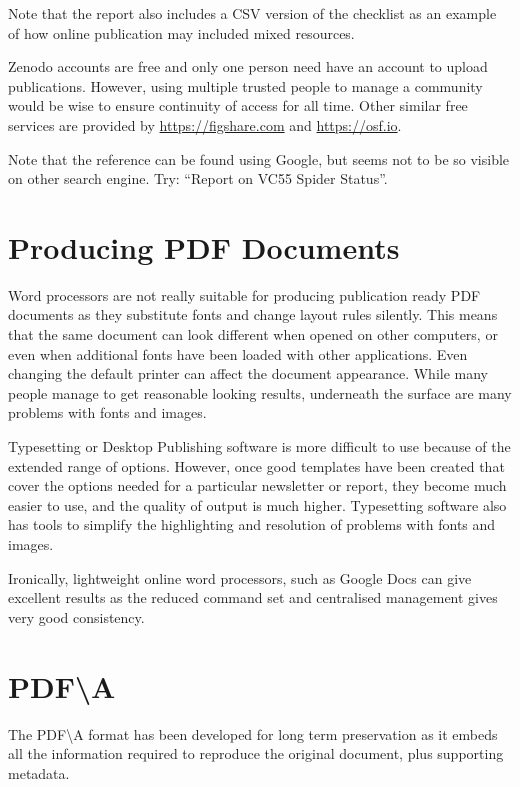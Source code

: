 \documentclass{article}
\begin{document}
 Note that the report also includes a CSV version of the checklist as an example of how online publication may included mixed resources.

Zenodo accounts are free and only one person need have an account to upload publications. However, using multiple trusted people to manage a community would be wise to ensure continuity of access for all time. 
Other similar free services are provided by \url{https://figshare.com} and \url{https://osf.io}. 



Note that the reference can be found using Google, but seems not to be so visible on other search engine. Try: \enquote{Report on VC55 Spider Status}.

\section{Producing PDF Documents}

Word processors are not really suitable for producing publication ready PDF documents as they substitute fonts and change layout rules silently. This means that the same document can look different when opened on other computers, or even when additional fonts have been loaded with other applications. Even changing the default printer can affect the document  appearance. While many people manage to get reasonable looking results, underneath the surface are many problems with fonts and images.

Typesetting or Desktop Publishing software is more difficult to use because of the extended range of options. However, once good templates have been created that cover the options needed for a particular newsletter or report, they become much easier to use, and the quality of  output is much higher.  Typesetting software also has tools to simplify the highlighting and resolution of problems with fonts and images.

Ironically, lightweight online word processors, such as Google Docs can give excellent results as the reduced command set and centralised management gives very good consistency.

\section{PDF\textbackslash A}

The PDF\textbackslash A format has been developed for long term preservation  as it embeds all the information required to reproduce the original document, plus supporting metadata. 
\end{document}

